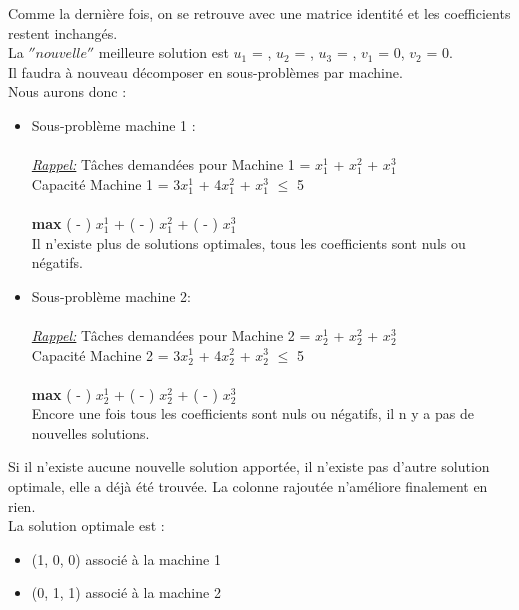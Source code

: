 Comme la dernière fois, on se retrouve avec une matrice identité et les coefficients restent inchangés. \\
La \textit{$''nouvelle''$} meilleure solution est \textit{$u_1$} = ,  \textit{$u_2$} = , \textit{$u_3$} = , \textit{$v_1$} = 0, \textit{$v_2$} = 0.    
\\
Il faudra à nouveau décomposer en sous-problèmes par machine.
\\
Nous aurons donc : 
\\
\begin{itemize}
\item{
Sous-problème machine 1 : \\ \\ 
\textit{\underline{Rappel:}}  Tâches demandées pour Machine 1 =  $x_1^1$ + $x_1^2$ + $x_1^3$  \\ 
Capacité Machine 1 = 3$x_1^1$ + 4$x_1^2$ + $x_1^3$ $\leq$ 5
\\ \\ 
\textbf{max} (  -  ) $x_1^1$ + ( -  ) $x_1^2$ + ( -  ) $x_1^3$
\\
 Il n'existe plus de solutions optimales, tous les coefficients sont nuls ou négatifs. 
 \\

}

\item{
Sous-problème machine 2: 
\\
\\
\textit{\underline{Rappel:}}  Tâches demandées pour Machine 2 =  $x_2^1$ + $x_2^2$ + $x_2^3$  \\ 
Capacité Machine 2 = 3$x_2^1$ + 4$x_2^2$ + $x_2^3$ $\leq$ 5
\\ \\ 
\textbf{max} (  -  ) $x_2^1$ + ( -  ) $x_2^2$ + ( - ) $x_2^3$
\\
Encore une fois tous les coefficients sont nuls ou négatifs, il n y a pas de nouvelles solutions.
}
\end{itemize}

Si il n'existe aucune nouvelle solution apportée, il n'existe pas d'autre solution optimale, elle a déjà été trouvée. La colonne rajoutée n'améliore finalement en rien.
\\
La solution optimale est :
\begin{itemize}
\item{(1, 0, 0) associé à la machine 1}
\item{(0, 1, 1) associé à la machine 2}
\end{itemize}

